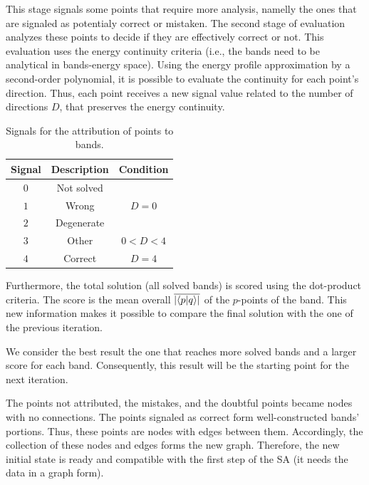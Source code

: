 \documentclass[a4paper,12pt]{report}
\begin{document}
\begin{appendices}
This stage signals some points that require more analysis, namelly the ones that are signaled as potentialy correct or mistaken.
The second stage of evaluation analyzes these points to decide if they are effectively correct or not.
This evaluation uses the energy continuity criteria (i.e., the bands need to be analytical in bands-energy space).
Using the energy profile approximation by a second-order polynomial, it is possible to evaluate the continuity for each point's direction.
Thus, each point receives a new signal value related to the number of directions $D$, that preserves the energy continuity.

\begin{table}[H]
    \center
    \caption{Signals for the attribution of points to bands.}\label{tab:signals2}
    \begin{tabular}{ccc}
        \hline
        Signal & Description       & Condition                                  \\\hline
        $0$    & Not solved        &                                            \\
        $1$    & Wrong             & $D=0$        \\
        $2$    & Degenerate        &                                            \\
        $3$    & Other             & $0<D<4$  \\
        $4$    & Correct           & $D = 4$           \\\hline
    \end{tabular}

\end{table}


Furthermore,  the total solution (all solved bands) is scored using the dot-product criteria.
The score is the mean overall $\overline{\left|\braket{p}{q}\right|}$ of the $p$-points of the band.
This new information makes it possible to compare the final solution with the one of the previous iteration.

We consider the best result the one that reaches more solved bands and a larger score for each band.
Consequently, this result will be the starting point for the next iteration.

The points not attributed, the mistakes, and the doubtful points became nodes with no connections.
The points signaled as correct form well-constructed bands' portions.
Thus, these points are nodes with edges between them.
Accordingly, the collection of these nodes and edges forms the new graph.
Therefore, the new initial state is ready and compatible with the first step of the SA (it needs the data in a graph form).


\end{appendices}
\end{document}
